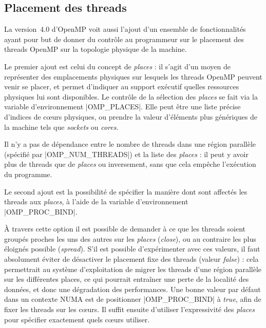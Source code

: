\subsection{Placement des threads}

La version~4.0 d'OpenMP voit aussi l'ajout d'un ensemble de fonctionnalités ayant pour but de donner du contrôle au programmeur sur le placement des threads OpenMP sur la topologie physique de la machine.

Le premier ajout est celui du concept de \emph{places} : il s'agit d'un moyen de représenter des emplacements physiques sur lesquels les threads OpenMP peuvent venir se placer, et permet d'indiquer au support exécutif quelles ressources physiques lui sont disponibles.
Le contrôle de la sélection des \emph{places} se fait via la variable d'environnement |OMP_PLACES|.
Elle peut être une liste précise d'indices de cœurs physiques, ou prendre la valeur d'éléments plus génériques de la machine tels que \emph{sockets} ou \emph{cores}.

Il n'y a pas de dépendance entre le nombre de threads dans une région parallèle (spécifié par |OMP_NUM_THREADS|) et la liste des \emph{places} : il peut y avoir plus de threads que de \emph{places} ou inversement, sans que cela empêche l'exécution du programme.

Le second ajout est la possibilité de spécifier la manière dont sont affectés les threads aux \emph{places}, à l'aide de la variable d'environnement |OMP_PROC_BIND|.

À travers cette option il est possible de demander à ce que les threads soient groupés proches les uns des autres sur les \emph{places} (\emph{close}), ou au contraire les plus éloignés possible (\emph{spread}).
S'il est possible d'expérimenter avec ces valeurs, il faut absolument éviter de désactiver le placement fixe des threads (valeur \emph{false}) : cela permettrait au système d'exploitation de migrer les threads d'une région parallèle sur les différentes places, ce qui pourrait entraîner une perte de la localité des données, et donc une dégradation des performances.
Une bonne valeur par défaut dans un contexte NUMA est de positionner |OMP_PROC_BIND| à \emph{true}, afin de fixer les threads sur les cœurs.
Il suffit ensuite d'utiliser l'expressivité des \emph{places} pour spécifier exactement quels cœurs utiliser.


